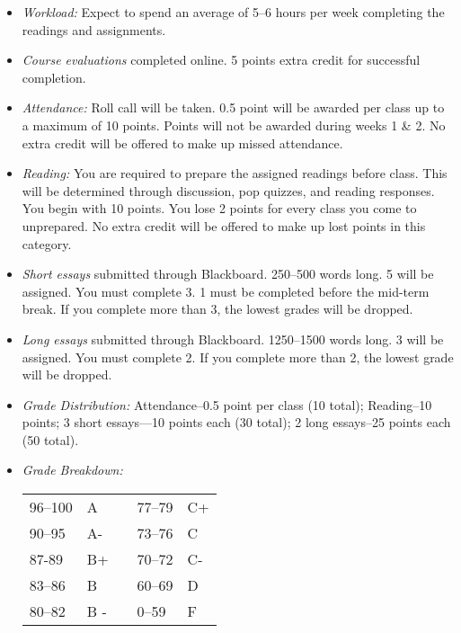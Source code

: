 \documentclass[article,oneside]{memoir}
\begin{document}
\begin{itemize}
\item \textit{Workload:} Expect to spend an average of 5--6 hours per week  completing the readings and assignments.

\item \textit{Course evaluations} completed online. 5 points extra credit for successful completion.

\item \textit{Attendance:} Roll call will be taken. 0.5 point will be awarded per class up to a maximum of 10 points. Points will not be awarded during weeks 1 \& 2. No extra credit will be offered to make up missed attendance.
\item \textit{Reading:} You are required to prepare the assigned readings before class. This will be determined through discussion, pop quizzes, and reading responses. You begin with 10 points. You lose 2 points for every class you come to unprepared. No extra credit will be offered to make up lost points in this category. 

\item \textit{Short essays} submitted through Blackboard. 250--500 words long. 5 will be assigned. You must complete 3. 1 must be completed before the mid-term break. If you complete more than 3, the lowest grades will be dropped.

 
\item \textit{Long essays} submitted through Blackboard. 1250--1500 words long. 3 will be assigned. You must complete 2. If you complete more than 2, the lowest grade will be dropped.


\item \textit{Grade Distribution:} Attendance--0.5 point per class (10 total); Reading--10 points; 3 short essays---10 points each (30 total); 2 long essays--25 points each (50 total).

\item \textit{Grade Breakdown:}

 \begin{tabular}{ | l | l | p{2cm} | l | l | }
    \hline 
96--100 & A  & &  77--79 &  C+ \\  
90--95 & A- & &  73--76 & C \\
87-89 & B+ &  &  70--72 & C- \\ 
83--86 & B  & &  60--69 & D\\
80--82 & B - & & 0--59 & F\\ \hline
    \end{tabular}


\end{itemize}
\end{document}
